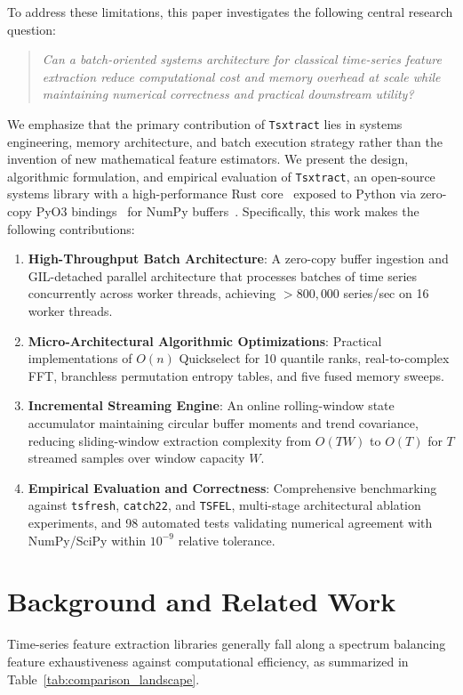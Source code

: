\documentclass[conference]{IEEEtran}
\newcommand{\tsxtract}{\texttt{Tsxtract}}
\newcommand{\tsfresh}{\texttt{tsfresh}}
\newcommand{\catchtwentytwo}{\texttt{catch22}}
\newcommand{\tsfel}{\texttt{TSFEL}}
\begin{document}
To address these limitations, this paper investigates the following central research question:
\begin{quote}
\textit{Can a batch-oriented systems architecture for classical time-series feature extraction reduce computational cost and memory overhead at scale while maintaining numerical correctness and practical downstream utility?}
\end{quote}

We emphasize that the primary contribution of \tsxtract{} lies in systems engineering, memory architecture, and batch execution strategy rather than the invention of new mathematical feature estimators. We present the design, algorithmic formulation, and empirical evaluation of \tsxtract{}, an open-source systems library with a high-performance Rust core~\cite{matsakis2014rust} exposed to Python via zero-copy PyO3 bindings~\cite{pyo3_rust_python} for NumPy buffers~\cite{harris2020array}. Specifically, this work makes the following contributions:
\begin{enumerate}
    \item \textbf{High-Throughput Batch Architecture}: A zero-copy buffer ingestion and GIL-detached parallel architecture that processes batches of time series concurrently across worker threads, achieving $>800,000$ series/sec on 16 worker threads.
    \item \textbf{Micro-Architectural Algorithmic Optimizations}: Practical implementations of $O(n)$ Quickselect for 10 quantile ranks, real-to-complex FFT, branchless permutation entropy tables, and five fused memory sweeps.
    \item \textbf{Incremental Streaming Engine}: An online rolling-window state accumulator maintaining circular buffer moments and trend covariance, reducing sliding-window extraction complexity from $O(TW)$ to $O(T)$ for $T$ streamed samples over window capacity $W$.
    \item \textbf{Empirical Evaluation and Correctness}: Comprehensive benchmarking against \tsfresh{}, \catchtwentytwo{}, and \tsfel{}, multi-stage architectural ablation experiments, and 98 automated tests validating numerical agreement with NumPy/SciPy within $10^{-9}$ relative tolerance.
\end{enumerate}

\section{Background and Related Work}
\label{sec:related_work}
Time-series feature extraction libraries generally fall along a spectrum balancing feature exhaustiveness against computational efficiency, as summarized in Table~\ref{tab:comparison_landscape}.
\end{document}
